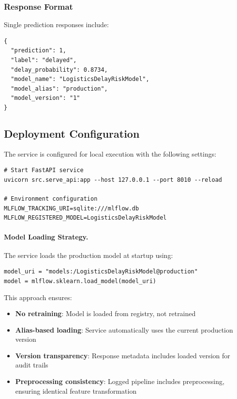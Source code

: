 \documentclass[11pt,a4paper]{article}
\begin{document}
\subsubsection{Response Format}

Single prediction responses include:
\begin{lstlisting}[style=json]
{
  "prediction": 1,
  "label": "delayed",
  "delay_probability": 0.8734,
  "model_name": "LogisticsDelayRiskModel",
  "model_alias": "production",
  "model_version": "1"
}
\end{lstlisting}

\subsection{Deployment Configuration}

The service is configured for local execution with the following settings:

\begin{lstlisting}[style=shell]
# Start FastAPI service
uvicorn src.serve_api:app --host 127.0.0.1 --port 8010 --reload

# Environment configuration
MLFLOW_TRACKING_URI=sqlite:///mlflow.db
MLFLOW_REGISTERED_MODEL=LogisticsDelayRiskModel
\end{lstlisting}

\paragraph{Model Loading Strategy.}
The service loads the production model at startup using:
\begin{lstlisting}[style=shell]
model_uri = "models:/LogisticsDelayRiskModel@production"
model = mlflow.sklearn.load_model(model_uri)
\end{lstlisting}

This approach ensures:
\begin{itemize}
    \item \textbf{No retraining}: Model is loaded from registry, not retrained
    \item \textbf{Alias-based loading}: Service automatically uses the current production version
    \item \textbf{Version transparency}: Response metadata includes loaded version for audit trails
    \item \textbf{Preprocessing consistency}: Logged pipeline includes preprocessing, ensuring identical feature transformation
\end{itemize}
\end{document}

